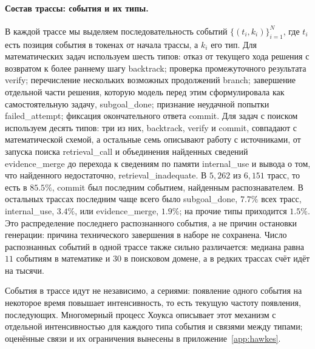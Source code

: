 \documentclass[11pt]{article}
\begin{document}
\paragraph{Состав трассы: события и их типы.} В каждой трассе мы выделяем последовательность событий $\{(t_i,k_i)\}_{i=1}^{N}$, где $t_i$ есть позиция события в токенах от начала трассы, а $k_i$ его тип. Для математических задач используем шесть типов: отказ от текущего хода решения с возвратом к более раннему шагу \textsf{backtrack}; проверка промежуточного результата \textsf{verify}; перечисление нескольких возможных продолжений \textsf{branch}; завершение отдельной части решения, которую модель перед этим сформулировала как самостоятельную задачу, \textsf{subgoal\_done}; признание неудачной попытки \textsf{failed\_attempt}; фиксация окончательного ответа \textsf{commit}. Для задач с поиском используем десять типов: три из них, \textsf{backtrack}, \textsf{verify} и \textsf{commit}, совпадают с математической схемой, а остальные семь описывают работу с источниками, от запуска поиска \textsf{retrieval\_call} и объединения найденных сведений \textsf{evidence\_merge} до перехода к сведениям по памяти \textsf{internal\_use} и вывода о том, что найденного недостаточно, \textsf{retrieval\_inadequate}. В $5{,}262$ из $6{,}151$ трасс, то есть в $85.5\%$, \textsf{commit} был последним событием, найденным распознавателем. В остальных трассах последним чаще всего было \textsf{subgoal\_done}, $7.7\%$ всех трасс, \textsf{internal\_use}, $3.4\%$, или \textsf{evidence\_merge}, $1.9\%$; на прочие типы приходится $1.5\%$. Это распределение последнего распознанного события, а не причин остановки генерации: причина технического завершения в наборе не сохранена. Число распознанных событий в одной трассе также сильно различается: медиана равна $11$ событиям в математике и $30$ в поисковом домене, а в редких трассах счёт идёт на тысячи.

События в трассе идут не независимо, а сериями: появление одного события на некоторое время повышает интенсивность, то есть текущую частоту появления, последующих. Многомерный процесс Хоукса \citep{hawkes1971,hawkes1974cluster} описывает этот механизм с отдельной интенсивностью для каждого типа события и связями между типами; оценённые связи и их ограничения вынесены в приложение~\ref{app:hawkes}.
\end{document}
